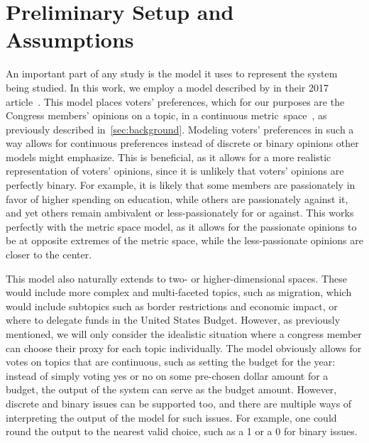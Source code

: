 \section{Preliminary Setup and Assumptions}\label{sec:setup-and-assumptions}
An important part of any study is the model it uses to represent the system being
studied.
In this work, we employ a model described by  in their 2017
article~\cite{Cohensius2017}.
This model places voters' preferences, which for our purposes are the Congress
members' opinions on a topic, in a continuous metric~space~\systemspace, as
previously described in~\autoref{sec:background}.
Modeling voters' preferences in such a way allows for continuous preferences instead of
discrete or binary opinions other models might emphasize.
This is beneficial, as it allows for a more realistic representation of voters'
opinions, since it is unlikely that voters' opinions are perfectly binary.
For example, it is likely that some members are passionately in favor of higher
spending on education, while others are passionately against it, and yet others
remain ambivalent or less-passionately for or against.
This works perfectly with the metric space model, as it allows for the passionate
opinions to be at opposite extremes of the metric space, while the less-passionate
opinions are closer to the center.

This model also naturally extends to two- or higher-dimensional spaces.
These would include more complex and multi-faceted topics, such as migration, which
would include subtopics such as border restrictions and economic impact, or where to
delegate funds in the United States Budget.
However, as previously mentioned, we will only consider the idealistic situation
where a congress member can choose their proxy for each topic individually.
The model obviously allows for votes on topics that are continuous, such as setting the
budget for the year: instead of simply voting yes or no on some pre-chosen dollar
amount for a budget, the output of the system can serve as the budget amount.
However, discrete and binary issues can be supported too, and there are multiple
ways of interpreting the output of the model for such issues.
For example, one could round the output to the nearest valid choice, such as a 1 or a
0 for binary issues.

